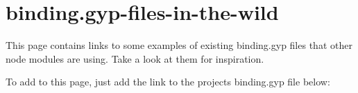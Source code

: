 \chapter{binding.\+gyp-\/files-\/in-\/the-\/wild}
\hypertarget{md__2_users_2hello_2_documents_2_git_hub_2finalproject-engine-drop-table-engines_2_engine_2src_2c64a5ce2d044131c90fbf897decbfd03}{}\label{md__2_users_2hello_2_documents_2_git_hub_2finalproject-engine-drop-table-engines_2_engine_2src_2c64a5ce2d044131c90fbf897decbfd03}
This page contains links to some examples of existing {\ttfamily binding.\+gyp} files that other node modules are using. Take a look at them for inspiration.

To add to this page, just add the link to the project\textquotesingle{}s {\ttfamily binding.\+gyp} file below\+:


